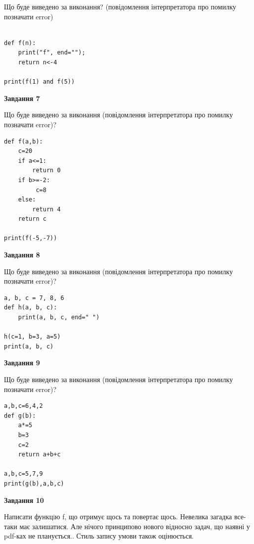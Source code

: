 \documentclass[12pt, ukrainian]{article}
\begin{document}
{\begin {large}
Що буде виведено за виконання? (повідомлення інтерпретатора про помилку позначати error)\par
\begin{verbatim}

def f(n):
    print("f", end="");
    return n<-4

print(f(1) and f(5))
\end{verbatim}

{\begin {center}\textbf{Завдання 7}\end {center}}

Що буде виведено за виконання (повідомлення інтерпретатора про помилку позначати error)?\par
\begin{verbatim}
def f(a,b):
    c=20
    if a<=1:
        return 0
    if b>=-2:
         c=8
    else: 
        return 4
    return c

print(f(-5,-7))
\end{verbatim}

{\begin {center}\textbf{Завдання 8}\end {center}}

Що буде виведено за виконання (повідомлення інтерпретатора про помилку позначати error)?\par
\begin{verbatim}
a, b, c = 7, 8, 6
def h(a, b, c):
    print(a, b, c, end=" ")

h(c=1, b=3, a=5)
print(a, b, c)
\end{verbatim}

{\begin {center}\textbf{Завдання 9}\end {center}}

Що буде виведено за виконання (повідомлення інтерпретатора про помилку позначати error)?\par
\begin{verbatim}
a,b,c=6,4,2
def g(b):
    a*=5
    b=3
    c=2
    return a+b+c

a,b,c=5,7,9
print(g(b),a,b,c)
\end{verbatim}

{\begin {center}\textbf{Завдання 10}\end {center}}


Написати функцiю f, що отримує щось та повертає щось. Невелика загадка все-таки має залишатися. Але нічого принципово нового відносно задач, що наявні у pdf-ках не планується.. Стиль запису умови також оцінюється.\par
\end {large}}
\newpage
\end{document}
